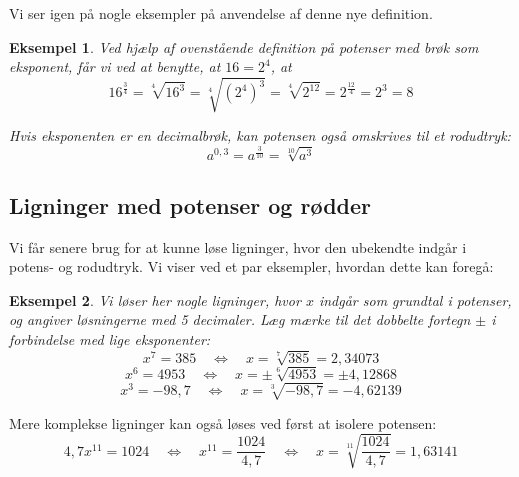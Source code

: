 \documentclass[12pt,oneside,a4paper]{article}
\theoremstyle{plain}
\newtheorem*{eks}{Eksempel}
\begin{document}
Vi ser igen på nogle eksempler på anvendelse af denne nye definition.
\begin{eks}
    Ved hjælp af ovenstående definition på potenser med brøk som eksponent,
    får vi ved at benytte, at $16=2^4$, at
    $$
    16^\frac34 = \sqrt[4]{16^3} = \sqrt[4]{\left(2^4\right)^3} = 
    \sqrt[4]{2^{12}} = 2^\frac{12}{4} = 2^3 = 8
    $$

    Hvis eksponenten er en decimalbrøk, kan potensen også omskrives til et rodudtryk:
    $$
    a^{0,3} = a^\frac{3}{10} = \sqrt[10]{a^3}
    $$
\end{eks}

\subsection*{Ligninger med potenser og rødder}

Vi får senere brug for at kunne løse ligninger, hvor den ubekendte indgår i
potens- og rodudtryk. Vi viser ved et par eksempler, hvordan dette kan foregå:

\begin{eks}
    Vi løser her nogle ligninger, hvor $x$ indgår som grundtal i potenser, og
    angiver løsningerne med 5 decimaler. Læg mærke til det dobbelte fortegn 
    $\pm$ i forbindelse med {\em lige} eksponenter:
    $$
    x^7 = 385 \quad\Leftrightarrow\quad x = \sqrt[7]{385} = 2,34073
    $$
    $$
    x^6 = 4953 \quad\Leftrightarrow\quad x = \pm \sqrt[6]{4953} = \pm 4,12868
    $$
    $$
    x^3 = -98,7 \quad\Leftrightarrow\quad x = \sqrt[3]{-98,7} = -4,62139
    $$
\end{eks}

Mere komplekse ligninger kan også løses ved først at isolere potensen:
$$
4,7 x^{11} = 1024 \quad \Leftrightarrow \quad
x^{11} = \frac{1024}{4,7} \quad \Leftrightarrow \quad
x = \sqrt[11]{\frac{1024}{4,7}} = 1,63141
$$
\end{document}
